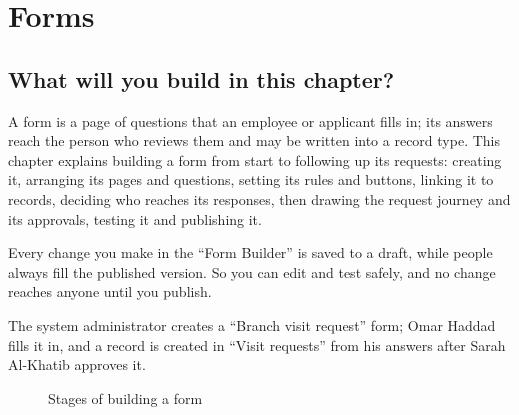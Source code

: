 \chapter{Forms}
\label{ch:builder-forms}

\section{What will you build in this chapter?}
\label{sec:builder-forms-intro}

A form is a page of questions that an employee or applicant fills in; its answers reach the person who reviews them and may be written into a record type. This chapter explains building a form from start to following up its requests: creating it, arranging its pages and questions, setting its rules and buttons, linking it to records, deciding who reaches its responses, then drawing the request journey and its approvals, testing it and publishing it.

Every change you make in the “Form Builder” is saved to a draft, while people always fill the published version. So you can edit and test safely, and no change reaches anyone until you publish.

\begin{rcnote}
The system administrator creates a “Branch visit request” form; Omar Haddad fills it in, and a record is created in “Visit requests” from his answers after Sarah Al-Khatib approves it.
\end{rcnote}

\begin{figure}[H]
\centering
{}
\rclegend
\caption{Stages of building a form}
\label{fig:builder-forms-overview}
\end{figure}

